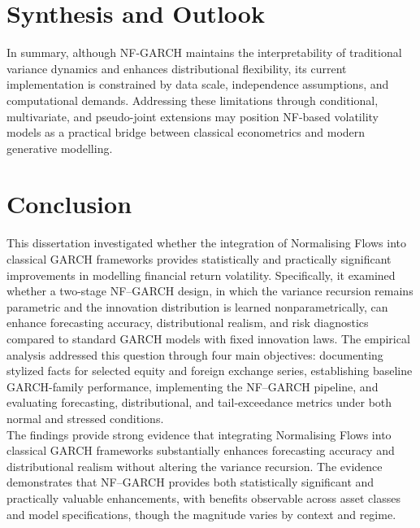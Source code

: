 \documentclass[oneside,12pt]{CUEDthesisPSnPDF}
\begin{document}

\section{Synthesis and Outlook}
\noindent
In summary, although NF-GARCH maintains the interpretability of traditional variance dynamics and enhances distributional flexibility, its current implementation is constrained by data scale, independence assumptions, and computational demands. Addressing these limitations through conditional, multivariate, and pseudo-joint extensions may position NF-based volatility models as a practical bridge between classical econometrics and modern generative modelling.\\


\section{Conclusion}
\noindent
This dissertation investigated whether the integration of Normalising Flows into classical GARCH frameworks provides statistically and practically significant improvements in modelling financial return volatility. Specifically, it examined whether a two-stage NF–GARCH design, in which the variance recursion remains parametric and the innovation distribution is learned nonparametrically, can enhance forecasting accuracy, distributional realism, and risk diagnostics compared to standard GARCH models with fixed innovation laws. The empirical analysis addressed this question through four main objectives: documenting stylized facts for selected equity and foreign exchange series, establishing baseline GARCH-family performance, implementing the NF–GARCH pipeline, and evaluating forecasting, distributional, and tail‑exceedance metrics under both normal and stressed conditions.\\

\medskip
\noindent
The findings provide strong evidence that integrating Normalising Flows into classical GARCH frameworks substantially enhances forecasting accuracy and distributional realism without altering the variance recursion. The evidence demonstrates that NF–GARCH provides both statistically significant and practically valuable enhancements, with benefits observable across asset classes and model specifications, though the magnitude varies by context and regime.\\
\end{document}
